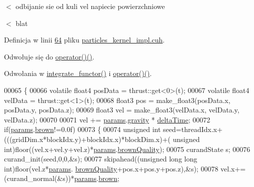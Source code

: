 $<$ odbijanie sie od kuli vel napiecie powierzchniowe

$<$ blat 

Definicja w linii \hyperlink{particles__kernel__impl_8cuh_source_l00064}{64} pliku \hyperlink{particles__kernel__impl_8cuh_source}{particles\-\_\-kernel\-\_\-impl.\-cuh}.



Odwołuje się do \hyperlink{particles__kernel__impl_8cuh_source_l00064}{operator()()}.



Odwołania w \hyperlink{particles__kernel__impl_8cuh_source_l00056}{integrate\-\_\-functor()} i \hyperlink{particles__kernel__impl_8cuh_source_l00064}{operator()()}.


\begin{DoxyCode}
00065     \{
00066         \textcolor{keyword}{volatile} float4 posData = thrust::get<0>(t);
00067         \textcolor{keyword}{volatile} float4 velData = thrust::get<1>(t);
00068         float3 pos = make\_float3(posData.x, posData.y, posData.z);
00069         float3 vel = make\_float3(velData.x, velData.y, velData.z);
00070 
00071         vel += \hyperlink{particles__kernel__impl_8cuh_a8db8938e28edd17862daf58651051bdc}{params}.\hyperlink{struct_sim_params_ae7508eba5dd90859215b59d19e001bb9}{gravity} * \hyperlink{structintegrate__functor_a06dce1826719cd5b2a9fdd9f566da754}{deltaTime};
00072                 \textcolor{keywordflow}{if}(\hyperlink{particles__kernel__impl_8cuh_a8db8938e28edd17862daf58651051bdc}{params}.\hyperlink{struct_sim_params_a88dae34e74c9184adfa9169bad06d0ee}{brown}!=0.0f)
00073         \{
00074                         \textcolor{keywordtype}{unsigned} \textcolor{keywordtype}{int} seed=threadIdx.x+(((gridDim.x*blockIdx.y)+blockIdx.x)*blockDim.x)+(\textcolor{keywordtype}{
      unsigned} \textcolor{keywordtype}{int})floor((vel.x+vel.y+vel.z)*\hyperlink{particles__kernel__impl_8cuh_a8db8938e28edd17862daf58651051bdc}{params}.\hyperlink{struct_sim_params_a366145dd58e2e7eacebffcbe78dd89ff}{brownQuality});
00075                         curandState s;
00076                         curand\_init(seed,0,0,&s);
00077                         skipahead((\textcolor{keywordtype}{unsigned} \textcolor{keywordtype}{long} \textcolor{keywordtype}{long} \textcolor{keywordtype}{int})floor(vel.z*\hyperlink{particles__kernel__impl_8cuh_a8db8938e28edd17862daf58651051bdc}{params}.
      \hyperlink{struct_sim_params_a366145dd58e2e7eacebffcbe78dd89ff}{brownQuality}+pos.x+pos.y+pos.z),&s);
00078                         vel.x+=(curand\_normal(&s))*\hyperlink{particles__kernel__impl_8cuh_a8db8938e28edd17862daf58651051bdc}{params}.\hyperlink{struct_sim_params_a88dae34e74c9184adfa9169bad06d0ee}{brown};

\end{DoxyCode}
